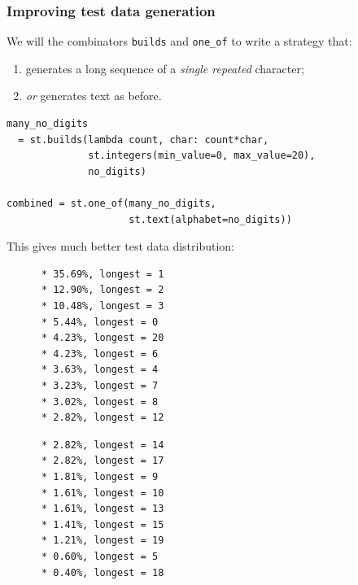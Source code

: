 \documentclass{beamer}
\begin{document}
\begin{frame}
  \frametitle{Improving test data generation}

We will the \alert{combinators}
\texttt{builds} and \texttt{one\_of}
to write a strategy that:
  \begin{enumerate}
\item generates a long sequence of a \emph{single repeated} character;
\item \emph{or} generates text as before.
\end{enumerate}
\bigskip

\begin{verbatim}
many_no_digits
  = st.builds(lambda count, char: count*char,
              st.integers(min_value=0, max_value=20),
              no_digits)

combined = st.one_of(many_no_digits,
                     st.text(alphabet=no_digits))
\end{verbatim}

\framebreak

This gives much better test data distribution:

\begin{center}
\begin{minipage}{0.5\textwidth}
{\small\begin{verbatim}
      * 35.69%, longest = 1
      * 12.90%, longest = 2
      * 10.48%, longest = 3
      * 5.44%, longest = 0
      * 4.23%, longest = 20
      * 4.23%, longest = 6
      * 3.63%, longest = 4
      * 3.23%, longest = 7
      * 3.02%, longest = 8
      * 2.82%, longest = 12
\end{verbatim}}
\end{minipage}\begin{minipage}{0.45\textwidth}
{\small\begin{verbatim}
      * 2.82%, longest = 14
      * 2.82%, longest = 17
      * 1.81%, longest = 9
      * 1.61%, longest = 10
      * 1.61%, longest = 13
      * 1.41%, longest = 15
      * 1.21%, longest = 19
      * 0.60%, longest = 5
      * 0.40%, longest = 18
\end{verbatim}}
\end{minipage}
\end{center}

\end{frame}
\end{document}
